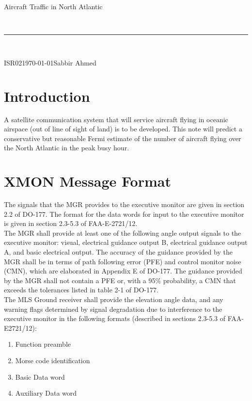 \documentclass[11pt]{article}
\newcommand{\header}[5]{
	\begin{centering}
		\parbox{6.8in}{
			\begin{flushright}
				\begin{spacing}{.8}{
					\fontfamily{cmss}{\large{\textbf{#1}}\\}}
					\small{
						#2\\
					}
				\end{spacing}
			\end{flushright}
		\vspace{-7.5mm}
		}\\
		\rule{\textwidth}{0.5pt}\\
		\vspace{-4mm}
	\end{centering}
}
\newcommand{\documentinfo}[5]{
	\begin{centering}
		\parbox{6.8in}{
		\begin{spacing}{1}
			\begin{flushleft}
				\begin{tabular}{l l}
					\fontfamily{cmss}{\textbf{DOC \#: }} & #1 \\
					\fontfamily{cmss}{\textbf{DATE: }} & #2 \\
					\fontfamily{cmss}{\textbf{BY: }} & #3 \\
				\end{tabular}\\
				\rule{\textwidth}{1pt}
			\end{flushleft}
		\end{spacing}
		}
	\end{centering}
}
\begin{document}
	\header{CMPE349}{Aircraft Traffic in North Atlantic}{}{}

	\documentinfo{ISR02}{\today}{Sabbir Ahmed}{}

	\section{Introduction}
	A satellite communication system that will service aircraft flying in oceanic airspace (out of line of sight of land) is to be developed. This note will predict a conservative but reasonable Fermi estimate of the number of aircraft flying over the North Atlantic in the peak busy hour.
 

	\section{XMON Message Format}
	The signals that the MGR provides to the executive monitor are given in section 2.2 of DO-177. The format for the data words for input to the executive monitor is given in section 2.3-5.3 of FAA-E-2721/12.\\
	The MGR shall provide at least one of the following angle output signals to the executive monitor: visual, electrical guidance output B, electrical guidance output A, and basic electrical output. The accuracy of the guidance provided by the MGR shall be in terms of path following error (PFE) and control monitor noise (CMN), which are elaborated in Appendix E of DO-177. The guidance provided by the MGR shall not contain a PFE or, with a 95\% probability, a CMN that exceeds the tolerances listed in table 2-1 of DO-177.\\
	The MLS Ground receiver shall provide the elevation angle data, and any warning flags determined by signal degradation due to interference to the executive monitor in the following formats (described in sections 2.3-5.3 of FAA-E2721/12):
		\begin{enumerate}

			\item Function preamble

			\item Morse code identification

			\item Basic Data word

			\item Auxiliary Data word

		\end{enumerate}
\end{document}
